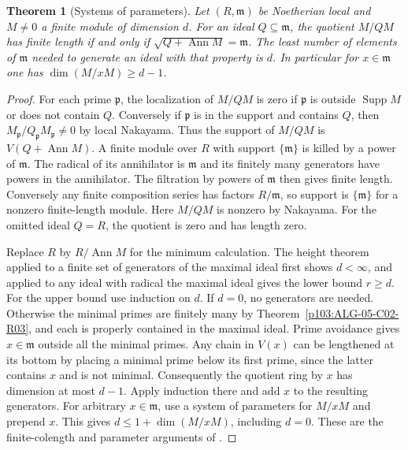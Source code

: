 \documentclass[11pt,oneside,openany]{book}
\newtheorem{theorem}{Theorem}[chapter]
\theoremstyle{definition}
\theoremstyle{remark}
\begin{document}
\begin{theorem}[Systems of parameters]\label{p103:ALG-05-C03-S01}
Let \((R,\mathfrak m)\) be Noetherian local and \(M\ne0\) a finite module of dimension \(d\). For an ideal \(Q\subseteq\mathfrak m\), the quotient \(M/QM\) has finite length if and only if \(\sqrt{Q+\operatorname{Ann}M}=\mathfrak m\). The least number of elements of \(\mathfrak m\) needed to generate an ideal with that property is \(d\). In particular for \(x\in\mathfrak m\) one has
\(\dim(M/xM)\ge d-1\).
\end{theorem}
\begin{proof}
For each prime \(\mathfrak p\), the localization of \(M/QM\) is zero if \(\mathfrak p\) is outside \(\operatorname{Supp}M\) or does not contain \(Q\). Conversely if \(\mathfrak p\) is in the support and contains \(Q\), then \(M_{\mathfrak p}/Q_{\mathfrak p}M_{\mathfrak p}\ne0\) by local Nakayama. Thus the support of \(M/QM\) is \(V(Q+\operatorname{Ann}M)\). A finite module over \(R\) with support \(\{\mathfrak m\}\) is killed by a power of \(\mathfrak m\). The radical of its annihilator is \(\mathfrak m\) and its finitely many generators have powers in the annihilator. The filtration by powers of \(\mathfrak m\) then gives finite length. Conversely any finite composition series has factors \(R/\mathfrak m\), so support is \(\{\mathfrak m\}\) for a nonzero finite-length module. Here \(M/QM\) is nonzero by Nakayama. For the omitted ideal \(Q=R\), the quotient is zero and has length zero.

Replace \(R\) by \(R/\operatorname{Ann}M\) for the minimum calculation. The height theorem applied to a finite set of generators of the maximal ideal first shows \(d<\infty\), and applied to any ideal with radical the maximal ideal gives the lower bound \(r\ge d\). For the upper bound use induction on \(d\). If \(d=0\), no generators are needed. Otherwise the minimal primes are finitely many by Theorem~\ref{p103:ALG-05-C02-R03}, and each is properly contained in the maximal ideal. Prime avoidance gives \(x\in\mathfrak m\) outside all the minimal primes. Any chain in \(V(x)\) can be lengthened at its bottom by placing a minimal prime below its first prime, since the latter contains \(x\) and is not minimal. Consequently the quotient ring by \(x\) has dimension at most \(d-1\). Apply induction there and add \(x\) to the resulting generators. For arbitrary \(x\in\mathfrak m\), use a system of parameters for \(M/xM\) and prepend \(x\). This gives \(d\le 1+\dim(M/xM)\), including \(d=0\). These are the finite-colength and parameter arguments of \cite[Section 10.1]{eisenbud}.
\end{proof}
\end{document}
